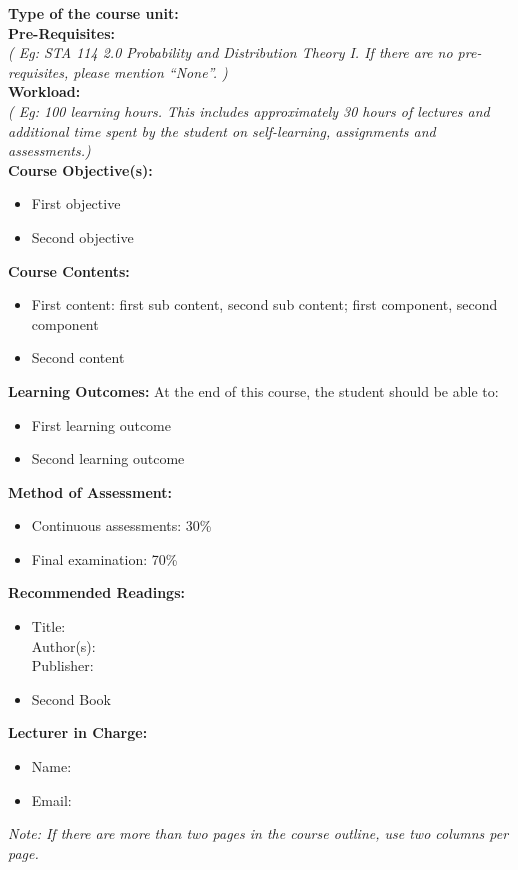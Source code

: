 \documentclass[a4paper,12pt]{article}
\begin{document}
\noindent\textbf{Type of the course unit:}\\

\noindent\textbf{Pre-Requisites:}\\
\noindent\textit{{\scriptsize ( Eg: STA 114 2.0 Probability and Distribution Theory I. If there are no pre-requisites, please mention ``None''. )}}\\

\noindent\textbf{Workload:}\\
\noindent\textit{{\scriptsize ( Eg: 100 learning hours. This includes approximately 30 hours of lectures and additional time spent by the student on self-learning, assignments and assessments.)}}\\

\noindent\textbf{Course Objective(s):}
\begin{itemize}
	\setlength\itemsep{0.1mm}
	\item First objective
	\item Second objective
\end{itemize}
\noindent\textbf{Course Contents:}
\begin{itemize}
	\setlength\itemsep{0.1mm}
	\item First content: first sub content, second sub content; first component, second component 
	\item Second content 
\end{itemize}

\noindent\textbf{Learning Outcomes:}
At the end of this course, the student should be able to:
\begin{itemize}
	\setlength\itemsep{0.1mm}
	\item First learning outcome
	\item Second learning outcome
\end{itemize}

\noindent\textbf{Method of Assessment:}
\begin{itemize}
	\setlength\itemsep{0.1mm}
	\item Continuous assessments: 30\%
	\item Final examination: 70\%
\end{itemize}

\noindent\textbf{Recommended Readings:}
\begin{itemize}
	\setlength\itemsep{0.1mm}
	\item Title: \\
		  Author(s): \\
		  Publisher:
	\item Second Book
\end{itemize}

\noindent\textbf{Lecturer in Charge:}

\begin{itemize}
	\setlength\itemsep{0.1mm}
	\item[] Name: 
	\item[] Email:
\end{itemize}


\textit{\color{red}Note: If there are more than two pages in the course outline, use two columns per page.}
\end{document}
